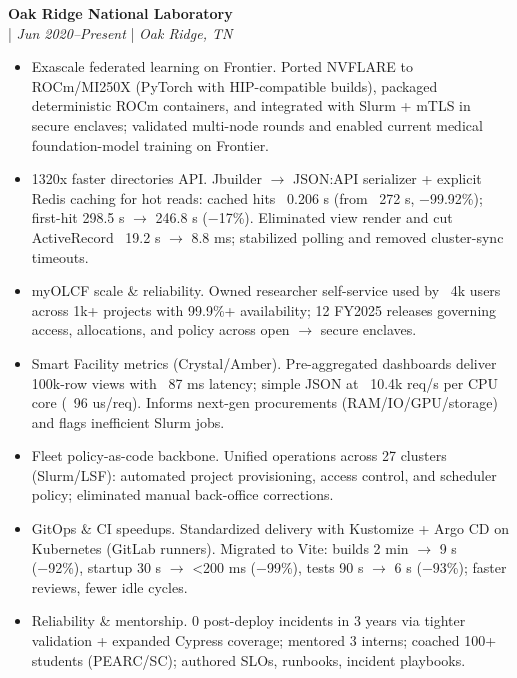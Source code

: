 \documentclass[11pt,a4paper]{article}
\newcommand{\regbullet}[1]{
    \item {\fontsize{10}{12}\selectfont #1}
}
\begin{document}
\noindent\textbf{Oak Ridge National Laboratory}\\
  |  {\fontsize{10}{12}\selectfont\textit{Jun 2020--Present}}  |  {\fontsize{10}{12}\selectfont\textit{Oak Ridge, TN}}
\begin{itemize}[leftmargin=18pt,itemsep=1pt,topsep=0pt]
\regbullet{Exascale federated learning on Frontier. Ported NVFLARE to ROCm/MI250X (PyTorch with HIP-compatible builds), packaged deterministic ROCm containers, and integrated with Slurm + mTLS in secure enclaves; validated multi-node rounds and enabled current medical foundation-model training on Frontier.}

\regbullet{1320x faster directories API. Jbuilder $\rightarrow$ JSON:API serializer + explicit Redis caching for hot reads: cached hits ~0.206 s (from ~272 s, −99.92\%); first-hit 298.5 s $\rightarrow$ 246.8 s (−17\%). Eliminated view render and cut ActiveRecord ~19.2 s $\rightarrow$ 8.8 ms; stabilized polling and removed cluster-sync timeouts.}

\regbullet{myOLCF scale \& reliability. Owned researcher self-service used by ~4k users across 1k+ projects with 99.9\%+ availability; 12 FY2025 releases governing access, allocations, and policy across open $\rightarrow$ secure enclaves.}

\regbullet{Smart Facility metrics (Crystal/Amber). Pre-aggregated dashboards deliver 100k-row views with ~87 ms latency; simple JSON at ~10.4k req/s per CPU core (~96 us/req). Informs next-gen procurements (RAM/IO/GPU/storage) and flags inefficient Slurm jobs.}

\regbullet{Fleet policy-as-code backbone. Unified operations across 27 clusters (Slurm/LSF): automated project provisioning, access control, and scheduler policy; eliminated manual back-office corrections.}

\regbullet{GitOps \& CI speedups. Standardized delivery with Kustomize + Argo CD on Kubernetes (GitLab runners). Migrated to Vite: builds 2 min $\rightarrow$ 9 s (−92\%), startup 30 s $\rightarrow$ <200 ms (−99\%), tests 90 s $\rightarrow$ 6 s (−93\%); faster reviews, fewer idle cycles.}

\regbullet{Reliability \& mentorship. 0 post-deploy incidents in 3 years via tighter validation + expanded Cypress coverage; mentored 3 interns; coached 100+ students (PEARC/SC); authored SLOs, runbooks, incident playbooks.}
\end{itemize}
\end{document}
